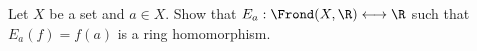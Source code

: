 Let $X$ be a set and $a \in X$. Show that $E_a : \Frond(X, \R) \longleftrightarrow \R$ such that $E_a(f) = f(a)$ is a ring homomorphism.